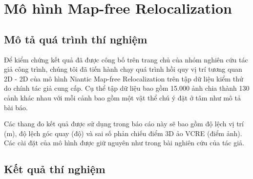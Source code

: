 \section{Mô hình Map-free Relocalization}
\subsection*{Mô tả quá trình thí nghiệm}

Để kiểm chứng kết quả đã được công bố trên trang chủ của nhóm nghiên cứu tác giả công trình, chúng tôi đã tiến hành chạy quá trình hồi quy vị trí tương quan 2D - 2D của mô hình Niantic Map-free Relocalization trên tập dữ liệu kiểm thử do chính tác giả cung cấp. Cụ thể tập dữ liệu bao gồm 15.000 ảnh chia thành 130 cảnh khác nhau với mỗi cảnh bao gồm một vật thể chú ý đặt ở tâm như mô tả bài báo.

Các thang đo kết quả được sử dụng trong báo cáo này sẽ bao gồm độ lệch vị trí (m), độ lệch góc quay (độ) và sai số phản chiếu điểm 3D ảo VCRE (điểm ảnh). Các cài đặt của mô hình được giữ nguyên như trong bài nghiên cứu của tác giả.

\subsection*{Kết quả thí nghiệm}

